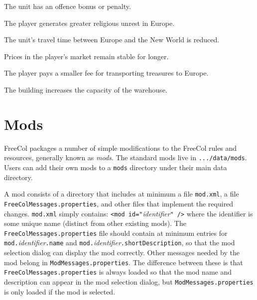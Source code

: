 \documentclass[12pt]{book}
\begin{document}
\affectsUnit

The unit has an offence bonus or penalty.

\affectsPlayer

The player generates greater religious unrest in Europe.

\affectsUnit

The unit's travel time between Europe and the New World is reduced.

\affectsPlayer

Prices in the player's market remain stable for longer.

\affectsPlayer

The player pays a smaller fee for transporting treasures to Europe.

\affectsBuilding

The building increases the capacity of the warehouse.

\hypertarget{Mods}{\chapter{Mods}}

FreeCol packages a number of simple modifications to the FreeCol rules
and resources, generally known as \emph{mods}. The standard mods live
in \texttt{.../data/mods}. Users can add their own mods to a
\texttt{mods} directory under their main data directory.

A mod consists of a directory that includes at minimum a file
\texttt{mod.xml}, a file \texttt{FreeColMessages.properties}, and
other files that implement the required changes. \texttt{mod.xml}
simply contains: \texttt{<mod id="}\emph{identifier}\texttt{" />}
where the identifier is some unique name (distinct from other existing
mods). The \texttt{FreeColMessages.properties} file should contain at
minimum entries for \texttt{mod.}\emph{identifier}\texttt{.name} 
and \texttt{mod.}\emph{identifier}\texttt{.shortDescription}, so that
the mod selection dialog can display the mod correctly. Other
messages needed by the mod belong in \texttt{ModMessages.properties}.
The difference between these is that
\texttt{FreeColMessages.properties} is always loaded so that the mod
name and description can appear in the mod selection dialog, but
\texttt{ModMessages.properties} is only loaded if the mod is selected.
\end{document}
